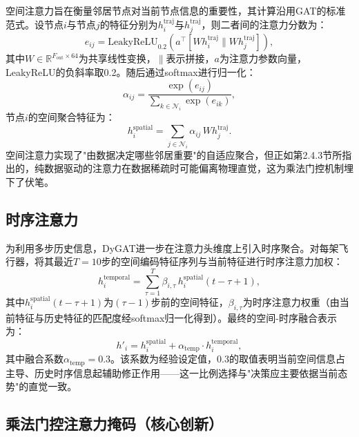 \documentclass[12pt,a4paper,UTF8]{ctexbook}
\begin{document}
空间注意力旨在衡量邻居节点对当前节点信息的重要性，其计算沿用GAT的标准范式。设节点$i$与节点$j$的特征分别为$h_i^{\text{traj}}$与$h_j^{\text{traj}}$，则二者间的注意力分数为：
\begin{equation}
    e_{ij} = \text{LeakyReLU}_{0.2}\!\left(a^{\top}[W h_i^{\text{traj}} \parallel W h_j^{\text{traj}}]\right),
    \label{eq:spatial_score}
\end{equation}
其中$W\in\mathbb{R}^{F_{\text{out}}\times64}$为共享线性变换，$\parallel$表示拼接，$a$为注意力参数向量，LeakyReLU的负斜率取0.2。随后通过softmax进行归一化：
\begin{equation}
    \alpha_{ij} = \frac{\exp(e_{ij})}{\sum_{k\in\mathcal{N}_i}\exp(e_{ik})},
    \label{eq:spatial_softmax}
\end{equation}
节点$i$的空间聚合特征为：
\begin{equation}
    h_i^{\text{spatial}} = \sum_{j\in\mathcal{N}_i}\alpha_{ij}\, W h_j^{\text{traj}}.
    \label{eq:spatial_agg}
\end{equation}
空间注意力实现了"由数据决定哪些邻居重要"的自适应聚合，但正如第2.4.3节所指出的，纯数据驱动的注意力在数据稀疏时可能偏离物理直觉，这为乘法门控机制埋下了伏笔。

\subsection{时序注意力}

为利用多步历史信息，DyGAT进一步在注意力头维度上引入时序聚合。对每架飞行器，将其最近$T=10$步的空间编码特征序列与当前特征进行时序注意力加权：
\begin{equation}
    h_i^{\text{temporal}} = \sum_{\tau=1}^{T} \beta_{i,\tau}\, h_i^{\text{spatial}}(t-\tau+1),
    \label{eq:temporal_attn}
\end{equation}
其中$h_i^{\text{spatial}}(t-\tau+1)$为$(\tau-1)$步前的空间特征，$\beta_{i,\tau}$为时序注意力权重（由当前特征与历史特征的匹配度经softmax归一化得到）。最终的空间-时序融合表示为：
\begin{equation}
    h'_i = h_i^{\text{spatial}} + \alpha_{\text{temp}} \cdot h_i^{\text{temporal}},
    \label{eq:temporal_fusion}
\end{equation}
其中融合系数$\alpha_{\text{temp}}=0.3$。该系数为经验设定值，0.3的取值表明当前空间信息占主导、历史时序信息起辅助修正作用——这一比例选择与"决策应主要依据当前态势"的直觉一致。

\subsection{乘法门控注意力掩码（核心创新）}
\end{document}
